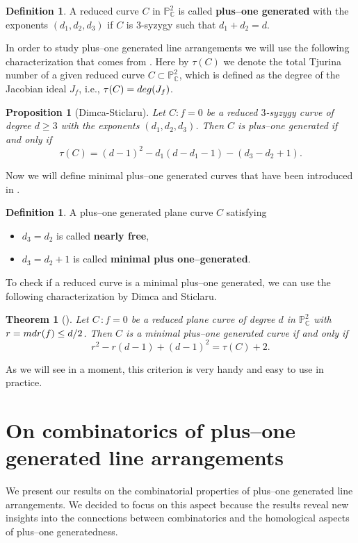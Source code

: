 \documentclass[12pt]{article}
\theoremstyle{plain}
\newtheorem{theorem}[thm]{Theorem}
\newtheorem{proposition}[thm]{Proposition}
\theoremstyle{definition}
\newtheorem{definition}[thm]{Definition}
\newtheorem{remark}[thm]{Remark}
\begin{document}
\begin{definition}
A reduced curve $C$ in $\mathbb{P}^{2}_{\mathbb{C}}$ is called \textbf{plus--one generated} with the exponents $(d_1,d_2,d_3)$ if $C$ is $3$-syzygy such that $d_{1}+d_{2}=d$. 
\end{definition}
In order to study plus--one generated line arrangements we will use the following characterization that comes from \cite{DS0}. Here by $\tau(C)$ we denote the total Tjurina number of a given reduced curve $C \subset \mathbb{P}^{2}_{\mathbb{C}}$, which is defined as the degree of the Jacobian ideal $J_{f}$, i.e., $\tau(C) = {\rm deg}(J_{f})$.
\begin{proposition}[Dimca-Sticlaru]
\label{dimspl}
Let $C: f=0$ be a reduced $3$-syzygy curve of degree $d\geq 3$ with the exponents $(d_{1},d_{2},d_{3})$. Then $C$ is plus--one generated if and only if
$$\tau(C) = (d-1)^{2} - d_{1}(d-d_{1}-1) - (d_{3}-d_{2}+1).$$
\end{proposition}
\noindent
Now we will define minimal plus--one generated curves that have been introduced in \cite{DS24}.
\begin{definition}
A plus--one generated plane curve $C$ satisfying
\begin{itemize}
    \item $d_3=d_2$ is called \textbf{nearly free},
    \item $d_3=d_2+1$ is called \textbf{minimal plus one--generated}.
\end{itemize}
\end{definition}

To check if a reduced curve is a minimal plus--one generated, we can use the following characterization by Dimca and Sticlaru.
\begin{theorem}[{\cite[Theorem 1.5]{DS24}}]
\label{MPOG}
Let $C \, : f=0$ be a reduced plane curve of degree $d$ in $\mathbb{P}^{2}_{\mathbb{C}}$ with $r = {\rm mdr}(f) \leq d/2$. Then $C$ is a minimal plus--one generated curve if and only if
$$r^{2} - r(d-1) + (d-1)^2 = \tau(C)+2.$$
\end{theorem}
\noindent
As we will see in a moment, this criterion is very handy and easy to use in practice.
\section{On combinatorics of plus--one generated line arrangements}
We present our results on the combinatorial properties of plus--one generated line arrangements. We decided to focus on this aspect because the results reveal new insights into the connections between combinatorics and the homological aspects of plus--one generatedness.
\end{document}

